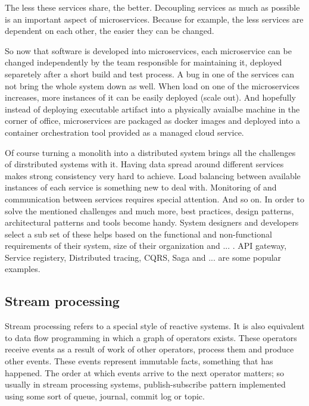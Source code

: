 \documentclass[a4]{report}
\begin{document}
        The less these services share, the better.
        Decoupling services as much as possible is an important aspect of microservices.
        Because for example, the less services are dependent on each other, the easier they can be changed.

        So now that software is developed into microservices, each microservice can be changed independently by the
        team responsible for maintaining it, deployed separetely after a short build and test process.
        A bug in one of the services can not bring the whole system down as well.
        When load on one of the microservices increases, more instances of it can be easily deployed (scale out).
        And hopefully instead of deploying executable artifact into a physically avaialbe machine in the corner of
        office, microservices are packaged as docker images and deployed into a container orchestration tool provided as
        a managed cloud service.

        Of course turning a monolith into a distributed system brings all the challenges of dirstributed systems with it.
        Having data spread around different services makes strong consistency very hard to achieve.
        Load balancing between available instances of each service is something new to deal with.
        Monitoring of and communication between services requires special attention.
        And so on.
        In order to solve the mentioned challenges and much more, best practices, design patterns, architectural patterns
        and tools become handy.
        System designers and developers select a sub set of these helps based on the functional and non-functional
        requirements of their system, size of their organization and ... .
        API gateway, Service registery, Distributed tracing, CQRS, Saga and ... are some popular examples.

        \subsection{Stream processing \cite{flink} \cite{fast-data-archs}}
        Stream processing refers to a special style of reactive systems.
        It is also equivalent to data flow programming in which a graph of operators exists.
        These operators receive events as a result of work of other operators, process them and produce other events.
        These events represent immutable facts, something that has happened.
        The order at which events arrive to the next operator matters; so usually in stream processing systems,
        publish-subscribe pattern implemented using some sort of queue, journal, commit log or topic.
\end{document}
